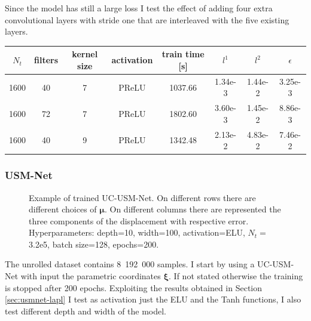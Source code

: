 \documentclass[11pt]{article}
\begin{document}
Since the model has still a large loss I test the effect of adding four extra convolutional layers with stride one that are interleaved with the five existing layers.


\begin{center}
\begin{tabular}{ |c|c|c|c|c|c|c|c| } 
 $N_t$ & filters & kernel size  &activation&  train time [s] & $l^1$ & $l^2$ & $\epsilon$ \\ 
 \hline
 1600 & 40 & 7 & PReLU & 1037.66 & 1.34e-3 & 1.44e-2 & 3.25e-3\\
 1600 & 72 & 7 & PReLU & 1802.60 & 3.60e-3 & 1.45e-2 & 8.86e-3\\
 1600 & 40 & 9 & PReLU & 1342.48 & 2.13e-2 & 4.83e-2 & 7.46e-2\\
\end{tabular}
\end{center}


\subsubsection{USM-Net}
\begin{figure}[ht]
    \centering
    \caption{Example of trained UC-USM-Net. On different rows there are different choices of $\boldsymbol \mu$. On different columns there are represented the three components of the displacement with respective error. Hyperparameters: depth=10, width=100, activation=ELU, $N_t=$3.2e5, batch size=128, epochs=200.}
    \label{fig:usmnet-kirchoff-trained}
\end{figure}

The unrolled dataset contains 8~192~000 samples. I start by using a UC-USM-Net with input the parametric coordinates $\boldsymbol \xi$. If not stated otherwise the training is stopped after 200 epochs. Exploiting the results obtained in Section \ref{sec:usmnet-lapl} I test as activation just the ELU and the Tanh functions, I also test different depth and width of the model.
\end{document}
